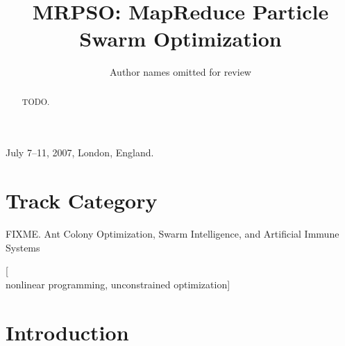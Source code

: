 \documentclass[letterpaper]{sig-alternate}
\begin{document}
\hyphenation{}

 {July 7--11, 2007, London, England.}

\title{MRPSO: MapReduce Particle Swarm Optimization}
\date{}

\author{Author names omitted for review}

\maketitle

\begin{abstract}
TODO.
\end{abstract}

\section*{Track Category}
FIXME. Ant Colony Optimization, Swarm Intelligence, and Artificial Immune Systems

[\\ nonlinear programming, unconstrained optimization]



\section{Introduction}
\end{document}
